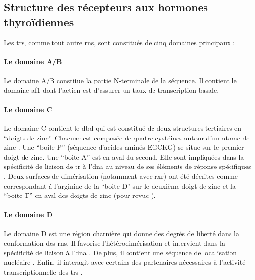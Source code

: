 \documentclass[../main.tex]{subfiles}
\begin{document}

	\subsection{Structure des récepteurs aux hormones thyroïdiennes}\label{subsubsec:struct-tr}
		Les \glspl{tr}, comme tout autre \glspl{rn}, sont constitués de cinq domaines principaux :

		\paragraph{Le domaine A/B}
			Le domaine A/B constitue la partie N-terminale de la séquence.
			Il contient le domaine \gls{af1} dont l'action est d'assurer un taux de transcription basale.

		\paragraph{Le domaine C}
			Le domaine C contient le \gls{dbd} qui est constitué de deux structures tertiaires en ``doigts de zinc''.
			Chacune est composée de quatre cystéines autour d'un atome de zinc \citep{Evans1988}.
			Une ``boite P'' (séquence d'acides aminés EGCKG) se situe sur le premier doigt de zinc.
			Une ``boite A'' est en aval du second.
			Elle sont impliquées dans la spécificité de liaison de \gls{tr} à l'\gls{dna} au niveau de ses éléments de réponse spécifiques \citep{Nelson1993}.
			Deux surfaces de dimérisation (notamment avec \gls{rxr}) ont été décrites comme correspondant à l’arginine de la ``boite D'' sur le deuxième doigt de zinc et la ``boite T'' en aval des doigts de zinc (pour revue \citealp{Bain2007}).

		\paragraph{Le domaine D}
			Le domaine D est une région charnière qui donne des degrés de liberté dans la conformation des \glspl{rn}.
			Il favorise l'hétérodimérisation et intervient dans la spécificité de liaison à l'\gls{dna} \citep{Miyamoto2001}.
			De plus, il contient une séquence de localisation nucléaire \citep{Hamy1992a}.
			Enfin, il interagit avec certains des partenaires nécessaires à l'activité transcriptionnelle des \glspl{tr} \citep{Lin1991,Horlein1995}.
\end{document}
